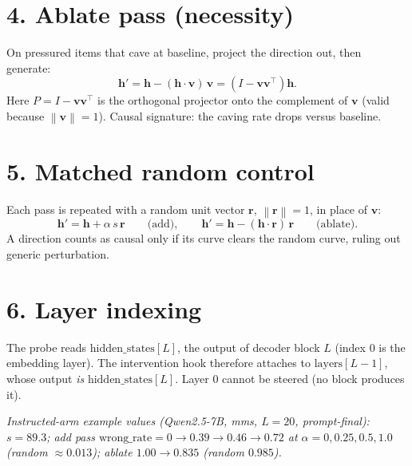 \documentclass[11pt]{article}
\newcommand{\vv}{\bm{v}}
\newcommand{\hh}{\bm{h}}
\newcommand{\rr}{\bm{r}}
\newcommand{\norm}[1]{\left\lVert #1 \right\rVert}
\begin{document}
\section*{4. Ablate pass (necessity)}

On pressured items that cave at baseline, project the direction out, then
generate:
\begin{equation}
  \hh' = \hh - (\hh \cdot \vv)\,\vv
       = \left(I - \vv\vv^{\top}\right)\hh .
\end{equation}
Here $P = I - \vv\vv^{\top}$ is the orthogonal projector onto the complement of
$\vv$ (valid because $\norm{\vv}=1$). Causal signature: the caving rate drops
versus baseline.

\section*{5. Matched random control}

Each pass is repeated with a random unit vector $\rr$, $\norm{\rr}=1$, in place
of $\vv$:
\begin{equation}
  \hh' = \hh + \alpha\, s\, \rr
  \qquad\text{(add)},
  \qquad
  \hh' = \hh - (\hh \cdot \rr)\,\rr
  \qquad\text{(ablate)}.
\end{equation}
A direction counts as causal only if its curve clears the random curve, ruling
out generic perturbation.

\section*{6. Layer indexing}

The probe reads $\text{hidden\_states}[L]$, the output of decoder block $L$
(index $0$ is the embedding layer). The intervention hook therefore attaches to
$\text{layers}[L-1]$, whose output \emph{is} $\text{hidden\_states}[L]$. Layer
$0$ cannot be steered (no block produces it).

\bigskip
\noindent\textit{Instructed-arm example values (Qwen2.5-7B, mms, $L{=}20$,
prompt-final): $s = 89.3$; add pass $\text{wrong\_rate} = 0 \to 0.39 \to 0.46
\to 0.72$ at $\alpha = 0,0.25,0.5,1.0$ (random $\approx 0.013$); ablate
$1.00 \to 0.835$ (random $0.985$).}
\end{document}
